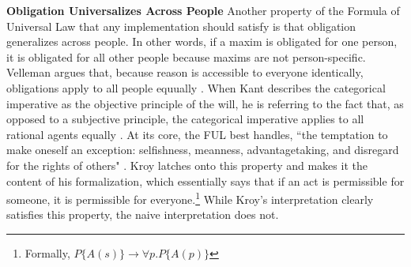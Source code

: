\begin{isabellebody}
\begin{isamarkuptext}
\textbf{Obligation Universalizes Across People} Another property of the Formula of Universal Law that any implementation should satisfy is that obligation
generalizes across people. In other words, if a maxim is obligated for one person, it is obligated
for all other people because maxims are not person-specific. Velleman argues that, because 
reason is accessible to everyone identically, obligations apply to all people equually \cite[25]{velleman}. 
When Kant describes the categorical imperative as the objective principle of the will, he is referring 
to the fact that, as opposed to a subjective principle, the categorical imperative applies to all 
rational agents equally \cite[16]{groundwork}. At its core, the FUL best handles, ``the temptation 
to make oneself an exception: selfishness, meanness, advantagetaking, and disregard for the rights 
of others" \cite[30]{KorsgaardFUL}. Kroy latches onto this property and makes it the content of his
formalization, which essentially says that if an act is permissible for someone, it is permissible for 
everyone.\footnote{Formally, $P\{A(s)\} \longrightarrow \forall p. P\{A(p)\}$} While Kroy's interpretation 
clearly satisfies this property, the naive interpretation does not.

\medskip


\end{isamarkuptext}
\end{isabellebody}
